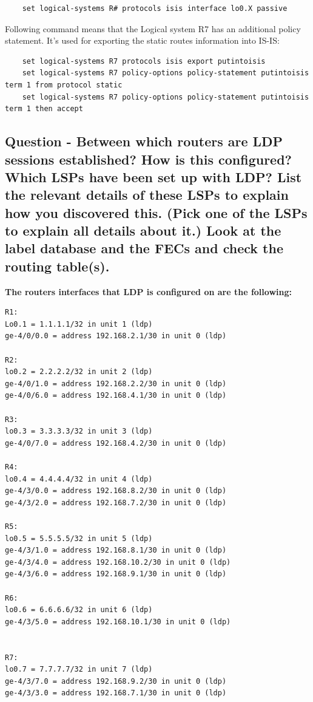 \documentclass[a4paper]{article}
\begin{document}
\begin{verbatim}    
    set logical-systems R# protocols isis interface lo0.X passive
\end{verbatim}


Following command means that the Logical system R7 has an additional policy statement. It's used for exporting the static routes information into IS-IS:

\begin{verbatim}
    set logical-systems R7 protocols isis export putintoisis
    set logical-systems R7 policy-options policy-statement putintoisis term 1 from protocol static 
    set logical-systems R7 policy-options policy-statement putintoisis term 1 then accept
\end{verbatim}




\subsection{Question - Between which routers are LDP sessions established? How is this configured? Which LSPs have been set up with LDP? List the relevant details of these LSPs to explain how you discovered this. (Pick one of the LSPs to explain all details about it.) Look at the label database and the FECs and check the routing table(s).}

\textbf{The routers interfaces that LDP is configured on are the following:}

\begin{verbatim}
R1:
Lo0.1 = 1.1.1.1/32 in unit 1 (ldp)
ge-4/0/0.0 = address 192.168.2.1/30 in unit 0 (ldp)

R2:
lo0.2 = 2.2.2.2/32 in unit 2 (ldp)
ge-4/0/1.0 = address 192.168.2.2/30 in unit 0 (ldp)
ge-4/0/6.0 = address 192.168.4.1/30 in unit 0 (ldp)

R3:
lo0.3 = 3.3.3.3/32 in unit 3 (ldp)
ge-4/0/7.0 = address 192.168.4.2/30 in unit 0 (ldp)

R4:
lo0.4 = 4.4.4.4/32 in unit 4 (ldp)
ge-4/3/0.0 = address 192.168.8.2/30 in unit 0 (ldp)
ge-4/3/2.0 = address 192.168.7.2/30 in unit 0 (ldp)

R5:
lo0.5 = 5.5.5.5/32 in unit 5 (ldp)
ge-4/3/1.0 = address 192.168.8.1/30 in unit 0 (ldp)
ge-4/3/4.0 = address 192.168.10.2/30 in unit 0 (ldp)
ge-4/3/6.0 = address 192.168.9.1/30 in unit 0 (ldp)

R6:
lo0.6 = 6.6.6.6/32 in unit 6 (ldp)
ge-4/3/5.0 = address 192.168.10.1/30 in unit 0 (ldp)


R7:
lo0.7 = 7.7.7.7/32 in unit 7 (ldp)
ge-4/3/7.0 = address 192.168.9.2/30 in unit 0 (ldp)
ge-4/3/3.0 = address 192.168.7.1/30 in unit 0 (ldp)
\end{verbatim}
\end{document}
